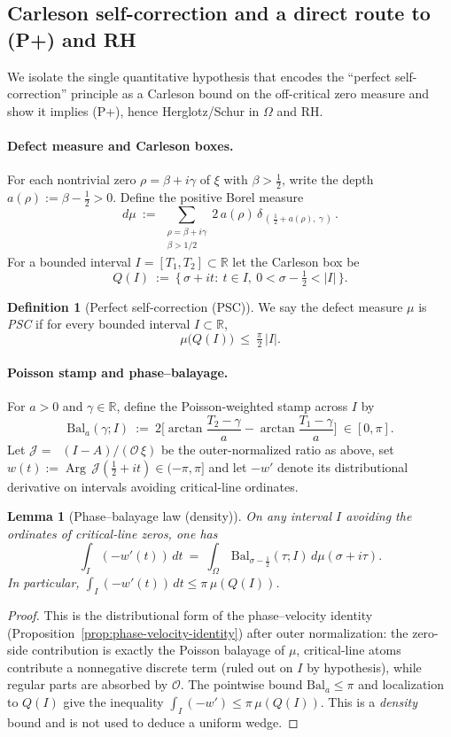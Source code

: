 \documentclass[11pt]{article}
\newtheorem{lemma}[theorem]{Lemma}
\theoremstyle{definition}
\newtheorem{definition}[theorem]{Definition}
\theoremstyle{remark}
\newcommand{\R}{\mathbb{R}}
\DeclareMathOperator{\dettwo}{det_2}
\DeclareMathOperator{\Arg}{Arg}
\begin{document}
\subsection{Carleson self-correction and a direct route to (P+) and RH}\label{subsec:PSC}
We isolate the single quantitative hypothesis that encodes the ``perfect self-correction'' principle as a Carleson bound on the off-critical zero measure and show it implies (P+), hence Herglotz/Schur in \(\Omega\) and RH.
\paragraph{Defect measure and Carleson boxes.}
For each nontrivial zero \(\rho=\beta+i\gamma\) of \(\xi\) with \(\beta>\tfrac12\), write the depth \(a(\rho):=\beta-\tfrac12>0\). Define the positive Borel measure
\[
 d\mu\ :=\ \sum_{\substack{\rho=\beta+i\gamma\\ \beta>1/2}} 2\,a(\rho)\,\delta_{\,(\,\tfrac12+a(\rho),\ \gamma\,)}\,.
\]
For a bounded interval \(I=[T_1,T_2]\subset\R\) let the Carleson box be
\[
 Q(I)\ :=\ \{\,\sigma+it:\ t\in I,\ 0<\sigma-\tfrac12<|I|\,\}.
\]
\begin{definition}[Perfect self-correction (PSC)]\label{def:PSC}
We say the defect measure \(\mu\) is \emph{PSC} if for every bounded interval \(I\subset\R\),
\[
 \mu\big(Q(I)\big)\ \le\ \tfrac{\pi}{2}\,|I|.
\]
\end{definition}
\paragraph{Poisson stamp and phase--balayage.}
For \(a>0\) and \(\gamma\in\R\), define the Poisson-weighted stamp across \(I\) by
\[
 \mathrm{Bal}_a(\gamma;I)\ :=\ 2\Big[\arctan\!\frac{T_2-\gamma}{a}-\arctan\!\frac{T_1-\gamma}{a}\Big]\ \in [0,\pi].
\]
Let \(\mathcal J=\dettwo(I-A)/(\mathcal O\,\xi)\) be the outer-normalized ratio as above, set \(w(t):=\Arg\,\mathcal J(\tfrac12+it)\in(-\pi,\pi] \) and let \(-w'\) denote its distributional derivative on intervals avoiding critical-line ordinates.
\begin{lemma}[Phase--balayage law (density)]\label{lem:balayage-law}
On any interval \(I\) avoiding the ordinates of critical-line zeros, one has
\[
 \int_I (-w'(t))\,dt\ =\ \int_{\Omega}\, \mathrm{Bal}_{\sigma-\frac12}(\tau;I)\, d\mu(\sigma+i\tau).
\]
In particular, \(\int_I (-w'(t))\,dt\le \pi\, \mu(Q(I))\).
\end{lemma}
\begin{proof}
This is the distributional form of the phase--velocity identity (Proposition~\ref{prop:phase-velocity-identity}) after outer normalization: the zero-side contribution is exactly the Poisson balayage of \(\mu\), critical-line atoms contribute a nonnegative discrete term (ruled out on \(I\) by hypothesis), while regular parts are absorbed by \(\mathcal O\). The pointwise bound \(\mathrm{Bal}_a\le\pi\) and localization to \(Q(I)\) give the inequality \(\int_I(-w')\le \pi\,\mu(Q(I))\). This is a \emph{density} bound and is not used to deduce a uniform wedge.
\end{proof}
\end{document}
